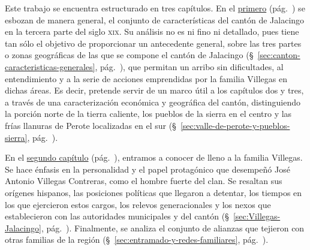 \documentclass[14pt,twoside,final]{extbook} %
\begin{document}
Este trabajo se encuentra estructurado en tres capítulos. En el \hyperref[ch:capitulo-uno]{primero} (pág.~\pageref{ch:capitulo-uno}) se esbozan de manera general, el conjunto de características del cantón de Jalacingo en la tercera parte del siglo \textsc{xix}. Su análisis no es ni fino ni detallado, pues tiene tan sólo el objetivo de proporcionar un antecedente general, sobre las tres partes o zonas geográficas de las que se compone el cantón de Jalacingo (\S~\ref{sec:canton-caracteristicas-generales}, pág.~\pageref{sec:canton-caracteristicas-generales}), que permitan un arribo sin dificultades, al entendimiento y a la serie de acciones emprendidas por la familia Villegas en dichas áreas. Es decir, pretende servir de un marco útil a los capítulos dos y tres, a través de una caracterización económica y geográfica del cantón, distinguiendo la porción norte de la tierra caliente, los pueblos de la sierra en el centro y las frías llanuras de Perote localizadas en el sur (\S~\ref{sec:valle-de-perote-y-pueblos-sierra}, pág.~\pageref{sec:valle-de-perote-y-pueblos-sierra}).

En el \hyperref[ch:capitulo-dos]{segundo capítulo} (pág.~\pageref{ch:capitulo-dos}), entramos a conocer de lleno a la familia Villegas. Se hace énfasis en la personalidad y el papel protagónico que desempeñó José Antonio Villegas Contreras, como el hombre fuerte del clan. Se resaltan sus orígenes hispanos, las posiciones políticas que llegaron a detentar, los tiempos en los que ejercieron estos cargos, los relevos generacionales y los nexos que establecieron con las autoridades municipales y del cantón (\S~\ref{sec:Villegas-Jalacingo}, pág.~\pageref{sec:Villegas-Jalacingo}). Finalmente, se analiza el conjunto de alianzas que tejieron con otras familias de la región (\S~\ref{sec:entramado-y-redes-familiares}, pág.~\pageref{sec:entramado-y-redes-familiares}).
\end{document}
